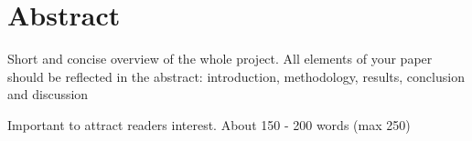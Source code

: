 \chapter{Abstract}

Short and concise overview of the whole project.
All elements of your paper should be reflected
in the abstract: introduction, methodology,
results, conclusion and discussion

Important to attract readers interest.
About 150 - 200 words (max 250)
